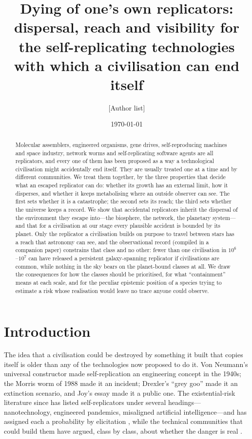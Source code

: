 \documentclass[11pt]{article}
\title{Dying of one's own replicators: dispersal, reach and visibility for the
self-replicating technologies with which a civilisation can end itself}
\author{[Author list]}
\date{\today}
\begin{document}
\maketitle

\begin{abstract}
Molecular assemblers, engineered organisms, gene drives, self-reproducing
machines and space industry, network worms and self-replicating software
agents are all replicators, and every one of them has been proposed as a way
a technological civilisation might accidentally end itself.  They are usually
treated one at a time and by different communities.  We treat them together,
by the three properties that decide what an escaped replicator can do:
whether its growth has an external limit, how it disperses, and whether it
keeps metabolising where an outside observer can see.  The first sets whether
it is a catastrophe; the second sets its reach; the third sets whether the
universe keeps a record.  We show that accidental replicators inherit the
dispersal of the environment they escape into---the biosphere, the network,
the planetary system---and that for a civilisation at our stage every
plausible accident is bounded by its planet.  Only the replicator a
civilisation builds on purpose to travel between stars has a reach that
astronomy can see, and the observational record (compiled in a companion
paper) constrains that class and no other: fewer than one civilisation in
$10^{6}$--$10^{7}$ can have released a persistent galaxy-spanning replicator if
civilisations are common, while nothing in the sky bears on the planet-bound
classes at all.  We draw the consequences for how the classes should be
prioritised, for what ``containment'' means at each scale, and for the
peculiar epistemic position of a species trying to estimate a risk whose
realisation would leave no trace anyone could observe.
\end{abstract}

\section{Introduction}

The idea that a civilisation could be destroyed by something it built that
copies itself is older than any of the technologies now proposed to do it.
Von Neumann's universal constructor \citep{FreitasMerkle2004} made
self-replication an engineering concept in the 1940s; the Morris worm of 1988
\citep{Spafford1989} made it an incident; Drexler's ``grey goo''
\citep{Drexler1986} made it an extinction scenario, and Joy's essay
\citep{Joy2000} made it a public one.  The existential-risk literature since
\citet{Bostrom2002} has listed self-replicators under several headings---
nanotechnology, engineered pandemics, misaligned artificial
intelligence---and has assigned each a probability by elicitation
\citep{Sandberg2008,Ord2020}, while the technical communities that could
build them have argued, class by class, about whether the danger is real
\citep{PhoenixDrexler2004,Adamala2024,Noble2018,Pan2024}.
\end{document}
